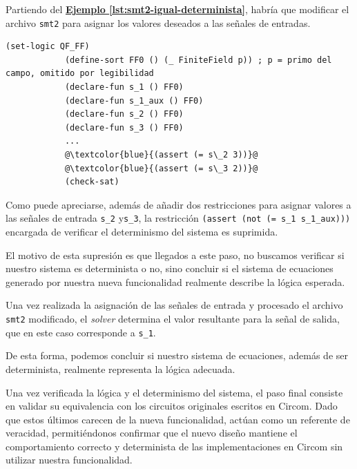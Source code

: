 \documentclass[a4paper,12pt]{report}
\begin{document}
	\vspace{0.2cm}
	\noindent Partiendo del \hyperref[lst:smt2-igual-determinista]{\textbf{Ejemplo \ref{lst:smt2-igual-determinista}}}, habría que modificar el archivo \texttt{smt2} para asignar los valores deseados a las señales de entradas.
	
	\begin{mi_ejemplo}
		\caption{Asignación de valores en archivo smt2}
		\label{lst:smt2-asignacion-valores}
		
		\begin{lstlisting}[escapechar=@,
			language={},
			basicstyle=\ttfamily\scriptsize,
			breaklines=true,
			frame=single,
			]
			(set-logic QF_FF)
			(define-sort FF0 () (_ FiniteField p)) ; p = primo del campo, omitido por legibilidad
			(declare-fun s_1 () FF0)
			(declare-fun s_1_aux () FF0)
			(declare-fun s_2 () FF0)
			(declare-fun s_3 () FF0)
			...
			@\textcolor{blue}{(assert (= s\_2 3))}@
			@\textcolor{blue}{(assert (= s\_3 2))}@
			(check-sat)
		\end{lstlisting}
	\end{mi_ejemplo}
	
	\vspace{0.2cm}
	\noindent Como puede apreciarse, además de añadir dos restricciones para asignar valores a las señales de entrada \texttt{s\_2} y\texttt{s\_3}, la restricción \texttt{(assert (not (= s\_1 s\_1\_aux)))} encargada de verificar el determinismo del sistema es suprimida.
	
	\vspace{0.2cm}
	\noindent El motivo de esta supresión es que llegados a este paso, no buscamos verificar si nuestro sistema es determinista o no, sino concluir si el sistema de ecuaciones generado por nuestra nueva funcionalidad realmente describe la lógica esperada.
	
	\vspace{0.2cm}
	\noindent Una vez realizada la asignación de las señales de entrada y procesado el archivo \texttt{smt2} modificado, el \textit{solver} determina el valor resultante para la señal de salida, que en este caso corresponde a \texttt{s\_1}.
	
	\vspace{0.2cm}
	\noindent De esta forma, podemos concluir si nuestro sistema de ecuaciones, además de ser determinista, realmente representa la lógica adecuada. 
	
	\vspace{0.2cm}
	\noindent Una vez verificada la lógica y el determinismo del sistema, el paso final consiste en validar su equivalencia con los circuitos originales escritos en Circom. Dado que estos últimos carecen de la nueva funcionalidad, actúan como un referente de veracidad, permitiéndonos confirmar que el nuevo diseño mantiene el comportamiento correcto y determinista de las implementaciones en Circom sin utilizar nuestra funcionalidad.
	
\end{document}
